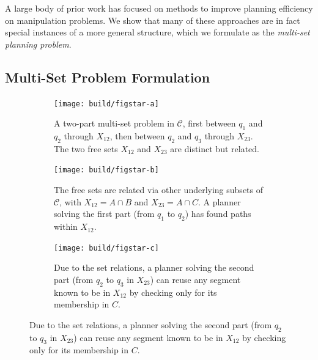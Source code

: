 A large body of prior work has focused on methods to
improve planning efficiency on manipulation problems.
We show that many of these approaches are
in fact special instances of a more general structure,
which we formulate as the \emph{multi-set planning problem}.

\subsection{Multi-Set Problem Formulation}
\label{sec:multi-set}

\begin{figure}
\begin{widepage}
\centering

\begin{subfigure}[t]{.32\linewidth}
\centering
\texttt{[image: build/figstar-a]}
\caption{A two-part multi-set problem in $\mathcal{C}$,
  first between $q_1$ and $q_2$ through $X_{12}$,
  then between $q_2$ and $q_3$ through $X_{23}$.
  The two free sets $X_{12}$ and $X_{23}$ are distinct
  but related.}
\end{subfigure}%
\quad%
\begin{subfigure}[t]{.32\linewidth}
\centering
\texttt{[image: build/figstar-b]}
\caption{The free sets are related via other underlying
  subsets of $\mathcal{C}$, with $X_{12}=A \cap B$
  and $X_{23}=A \cap C$.
  A planner solving the first part (from $q_1$ to $q_2$)
  has found paths within $X_{12}$.}
\label{subfig:figstar-intersections}
\end{subfigure}%
\quad%
\begin{subfigure}[t]{.32\linewidth}
\centering
\texttt{[image: build/figstar-c]}
\caption{Due to the set relations,
  a planner solving the second part
  (from $q_2$ to $q_3$ in $X_{23}$)
  can reuse any segment known to be in $X_{12}$
  by checking only for its membership in $C$.}
\end{subfigure}

\vspace{0.1in}


\end{widepage}
\end{figure}
